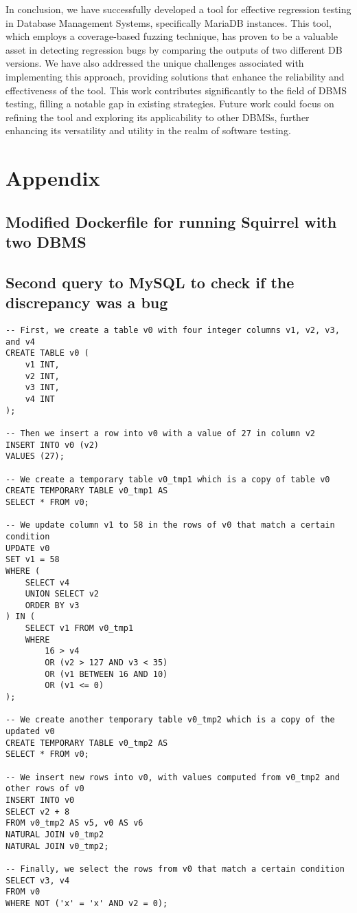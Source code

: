\documentclass[sigconf]{acmart}
\begin{document}
In conclusion, we have successfully developed a tool for effective regression testing in Database Management Systems, specifically MariaDB instances. This tool, which employs a coverage-based fuzzing technique, has proven to be a valuable asset in detecting regression bugs by comparing the outputs of two different DB versions. We have also addressed the unique challenges associated with implementing this approach, providing solutions that enhance the reliability and effectiveness of the tool. This work contributes significantly to the field of DBMS testing, filling a notable gap in existing strategies. Future work could focus on refining the tool and exploring its applicability to other DBMSs, further enhancing its versatility and utility in the realm of software testing.

\clearpage
\section{Appendix}
\label{app:dockerfile}
\subsection{Modified Dockerfile for running Squirrel with two DBMS}

\subsection{Second query to MySQL to check if the discrepancy was a bug}
\begin{lstlisting}
-- First, we create a table v0 with four integer columns v1, v2, v3, and v4
CREATE TABLE v0 (
    v1 INT,
    v2 INT,
    v3 INT,
    v4 INT
);

-- Then we insert a row into v0 with a value of 27 in column v2
INSERT INTO v0 (v2) 
VALUES (27);

-- We create a temporary table v0_tmp1 which is a copy of table v0
CREATE TEMPORARY TABLE v0_tmp1 AS 
SELECT * FROM v0;

-- We update column v1 to 58 in the rows of v0 that match a certain condition
UPDATE v0 
SET v1 = 58 
WHERE (
    SELECT v4 
    UNION SELECT v2 
    ORDER BY v3
) IN (
    SELECT v1 FROM v0_tmp1 
    WHERE 
        16 > v4 
        OR (v2 > 127 AND v3 < 35) 
        OR (v1 BETWEEN 16 AND 10) 
        OR (v1 <= 0)
);

-- We create another temporary table v0_tmp2 which is a copy of the updated v0
CREATE TEMPORARY TABLE v0_tmp2 AS 
SELECT * FROM v0;

-- We insert new rows into v0, with values computed from v0_tmp2 and other rows of v0
INSERT INTO v0 
SELECT v2 + 8 
FROM v0_tmp2 AS v5, v0 AS v6 
NATURAL JOIN v0_tmp2 
NATURAL JOIN v0_tmp2;

-- Finally, we select the rows from v0 that match a certain condition
SELECT v3, v4 
FROM v0 
WHERE NOT ('x' = 'x' AND v2 = 0);
\end{lstlisting}
\end{document}
